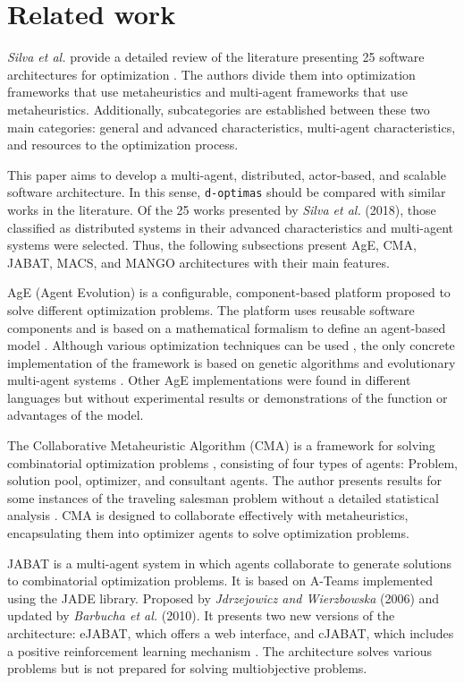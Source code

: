 \documentclass[preprint,12pt]{elsarticle}
\begin{document}
\section{Related work}
\label{sec:relatedWork}

\textit{Silva et al.} provide a detailed review of the literature presenting 25 software architectures for optimization \cite{silva2018}. The authors divide them into optimization frameworks that use metaheuristics and multi-agent frameworks that use metaheuristics. Additionally, subcategories are established between these two main categories: general and advanced characteristics, multi-agent characteristics, and resources to the optimization process.

This paper aims to develop a multi-agent, distributed, actor-based, and scalable software architecture. In this sense, \texttt{d-optimas} should be compared with similar works in the literature. Of the 25 works presented by\textit{ Silva et al.} (2018), those classified as distributed systems in their advanced characteristics and multi-agent systems were selected. Thus, the following subsections present AgE, CMA, JABAT, MACS, and MANGO architectures with their main features. 

AgE (Agent Evolution) is a configurable, component-based platform proposed to solve different optimization problems. The platform uses reusable software components and is based on a mathematical formalism to define an agent-based model \cite{piketak2009functional}. Although various optimization techniques can be used \cite{piketak2013agent}, the only concrete implementation of the framework is based on genetic algorithms and evolutionary multi-agent systems \cite{kisiel2004agent}. Other AgE implementations were found in different languages but without experimental results or demonstrations of the function or advantages of the model.

The Collaborative Metaheuristic Algorithm (CMA) is a framework for solving combinatorial optimization problems \cite{malek2009}, consisting of four types of agents: Problem, solution pool, optimizer, and consultant agents. The author presents results for some instances of the traveling salesman problem without a detailed statistical analysis \cite{malek2010}. CMA is designed to collaborate effectively with metaheuristics, encapsulating them into optimizer agents to solve optimization problems.

JABAT is a multi-agent system in which agents collaborate to generate solutions to combinatorial optimization problems. It is based on A-Teams implemented using the JADE library. Proposed by \textit{Jdrzejowicz and Wierzbowska} (2006) and updated by \textit{Barbucha et al.} (2010). It presents two new versions of the architecture: eJABAT, which offers a web interface, and cJABAT, which includes a positive reinforcement learning mechanism \cite{jedrzejowicz2006, barbucha2010}. The architecture solves various problems but is not prepared for solving multiobjective problems.
\end{document}
